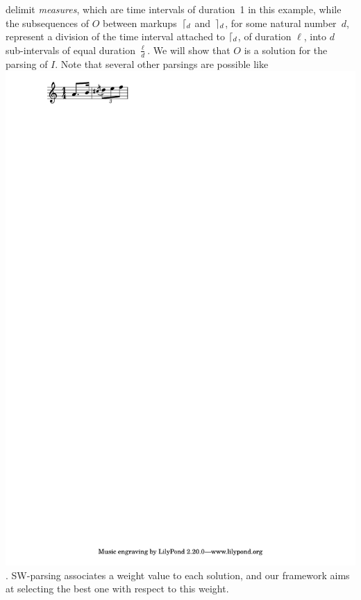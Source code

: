 \begin{example}
delimit \emph{measures},
which are time intervals of duration~1 in this example,
while the subsequences of $O$ between markups~$\lceil_{d}$ and~$\rceil_{d}$,
for some natural number~$d$,
represent a division of the time interval attached to $\lceil_{d}$,
of duration $\ell$,
into $d$ sub-intervals of equal duration $\frac{\ell}{d}$.
%
We will show that $O$ is a solution for the
parsing of $I$. Note that several other parsings are possible
like \eg \includegraphics[scale=0.35,trim=0 5mm 0 0]{pictures/ex2.pdf}.
SW-parsing associates a weight value
to each solution, and our framework
aims at selecting the best one with respect to this weight.
\endex
\end{example}
